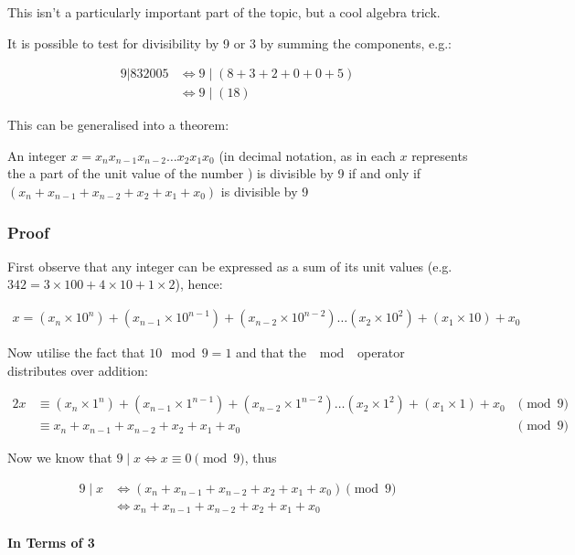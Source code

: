 \documentclass[
]{article}
\begin{document}
This isn't a particularly important part of the topic, but a cool
algebra trick.

It is possible to test for divisibility by 9 or 3 by summing the
components, e.g.:

\begin{align}
9|832005 &\iff 9 \mid (8+3+2+0+0+5) \\
&\iff 9 \mid (18)
\end{align}

This can be generalised into a theorem:

An integer \(x = x_nx_{n-1}x_{n-2} \dots x_2x_1x_0\) (in decimal
notation, as in each \(x\) represents the a part of the unit value of
the number ) is divisible by 9 if and only if
\(( x_n + x_{n-1} + x_{n-2} + x_2 + x_1 +x_0)\) is divisible by 9

\hypertarget{header-n660}{%
\subsubsection{Proof}\label{header-n660}}

First observe that any integer can be expressed as a sum of its unit
values (e.g. \(342 = 3 \times 100 + 4 \times 10 + 1 \times 2\)), hence:

\begin{align}
x = (x_n \times 10^n) + (x_{n-1} \times 10^{n-1}) + (x_{n-2} \times 10^{n-2}) \dots (x_2 \times 10^2) + (x_1 \times 10) + x_0
\end{align}

Now utilise the fact that \(10 \mod 9=1\) and that the \(\mod \ \)
operator distributes over addition:

\begin{alignat}{2}
x &\equiv (x_n \times 1^n) + (x_{n-1} \times 1^{n-1}) + (x_{n-2} \times 1^{n-2}) \dots (x_2 \times 1^2) + (x_1 \times 1) + x_0 &\pmod{9}\\
&\equiv  x_n + x_{n-1} + x_{n-2} + x_2 + x_1 +x_0 &\pmod{9}
\end{alignat}

Now we know that \(9 \mid x \iff x \equiv 0 \pmod{9}\), thus

\begin{align}
9 \mid x &\iff  (x_n + x_{n-1} + x_{n-2} + x_2 + x_1 +x_0) \pmod{9} \\
& \iff  x_n + x_{n-1} + x_{n-2} + x_2 + x_1 +x_0
\end{align}

\hypertarget{header-n667}{%
\paragraph{In Terms of 3}\label{header-n667}}
\end{document}
